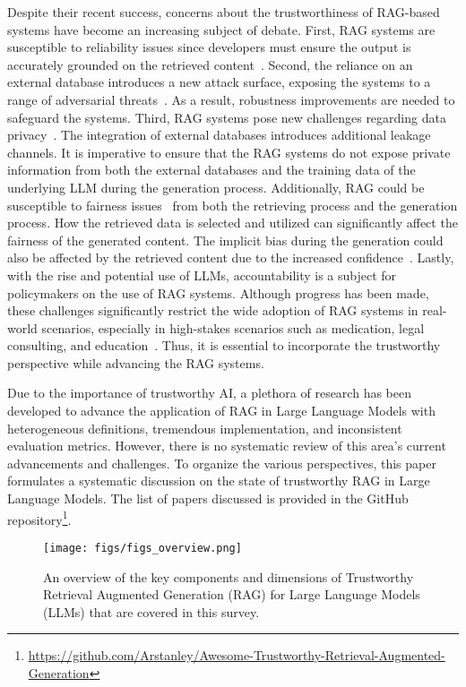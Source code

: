Despite their recent success, concerns about the trustworthiness of RAG-based
systems have become an increasing subject of debate. First, RAG systems are susceptible to reliability
issues since developers must ensure the output is accurately grounded on the retrieved content~\cite{li2023traq, Gao2023Retrieval}. Second, the reliance on an external database introduces a new attack surface, exposing the systems to a range of adversarial threats~\cite{dual_rag_2024, adaptive_adversarial_rag_2024,
robust_rag_2024, robust_rag_iclr_2024, misinformation_rag_2024,
alignment_rag_2023}. As a result, robustness improvements are needed to
safeguard the systems. Third, RAG systems pose new challenges regarding data
privacy~\cite{privacy_rag_2024}. The integration of external databases introduces additional leakage channels. It is imperative to ensure that the RAG systems do
not expose private information from both the external databases and the training data of the underlying LLM during the generation process. Additionally, RAG could be
susceptible to fairness issues~\cite{shrestha2024fairrag} from both the retrieving process and the generation process. How the retrieved data is
selected and utilized can significantly affect the fairness of the generated
content. The implicit bias during the generation could also be affected by the retrieved content due to the increased confidence~\cite{no_free_lunch_rag_2025}. Lastly, with the rise and potential use of LLMs, accountability is a subject for policymakers on the use of RAG systems. Although progress has been made, these
challenges significantly restrict the wide adoption of RAG systems in real-world
scenarios, especially in high-stakes scenarios such as medication, legal
consulting, and education~\cite{xiong2024benchmarkingretrievalaugmentedgenerationmedicine, Zakka2023Almanac,
Wiratunga2023CBR, Thway2023Battling}. Thus, it is essential to incorporate the
trustworthy perspective while advancing the RAG systems. 

Due to the importance of trustworthy AI, a plethora of research has been
developed to advance the application of RAG in Large Language Models with heterogeneous definitions, tremendous
implementation, and inconsistent evaluation metrics. However, there is no
systematic review of this area's current advancements and challenges. To organize the various perspectives, this paper formulates a systematic discussion on the state of
trustworthy RAG in Large Language Models. 
The list of papers discussed is provided in the GitHub repository\footnote{\url{https://github.com/Arstanley/Awesome-Trustworthy-Retrieval-Augmented-Generation}}.

\begin{figure*}[t]
 
    \centering
    \texttt{[image: figs/figs\_overview.png]}
    \label{fig:overview}
    \caption{An overview of the key components and dimensions of Trustworthy Retrieval Augmented Generation (RAG) for Large Language Models (LLMs) that are covered in this survey.  }
    \vspace{-0.1in}
\end{figure*}